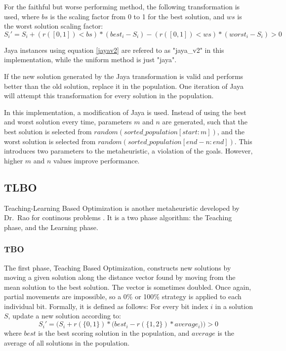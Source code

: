 \documentclass[11pt, letterpaper, onecolumn]{article}
\begin{document}
For the faithful but worse performing method, the following transformation is used, where $bs$ is the scaling factor from 0 to 1 for the best solution, and $ws$ is the worst solution scaling factor: 
\begin{equation}\label{jayav2} S_i' = S_i + (r([0,1])<bs)*(best_i - S_i) - (r([0, 1])<ws)*(worst_i - S_i) > 0 \end{equation}

Jaya instances using equation \ref{jayav2} are refered to as "jaya\_v2" in this implementation, while the uniform method is just "jaya". 

If the new solution generated by the Jaya transformation is valid and performs better than the old solution, replace it in the population. One iteration of Jaya will attempt this transformation for every solution in the population. 

In this implementation, a modification of Jaya is used. Instead of using the best and worst solution every time, parameters $m$ and $n$ are generated, such that the best solution is selected from $random(sorted\_population[start:m])$, and the worst solution is selected from $random(sorted\_population[end-n:end])$. This introduces two parameters to the metaheuristic, a violation of the goals. However, higher $m$ and $n$ values improve performance. 

\subsection{TLBO}

Teaching-Learning Based Optimization is another metaheuristic developed by Dr.~Rao for continous problems %
. It is a two phase algorithm: the Teaching phase, and the Learning phase.

\subsubsection{TBO}

The first phase, Teaching Based Optimization, constructs new solutions by moving a given solution along the distance vector found by moving from the mean solution to the best solution. The vector is sometimes doubled. Once again, partial movements are impossible, so a 0\% or 100\% strategy is applied to each individual bit. Formally, it is defined as follows: For every bit index $i$ in a solution $S$, update a new solution according to: 
\begin{equation}
S_i' = \Big(S_i + r(\{0, 1\})*\big(best_i - r(\{1, 2\})*average_i\big)\Big) > 0
\end{equation}
where $best$ is the best scoring solution in the population, and $average$ is the average of all solutions in the population. 
\end{document}
